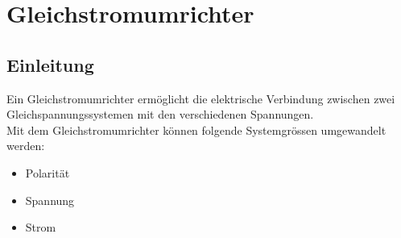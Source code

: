 \section{Gleichstromumrichter}
\subsection{Einleitung}
Ein Gleichstromumrichter ermöglicht die elektrische Verbindung zwischen zwei 
Gleichspannungssystemen mit den verschiedenen Spannungen.\\

Mit dem Gleichstromumrichter können folgende Systemgrössen umgewandelt werden:
\begin{itemize}
    \item Polarität
    \item Spannung
    \item Strom
\end{itemize}